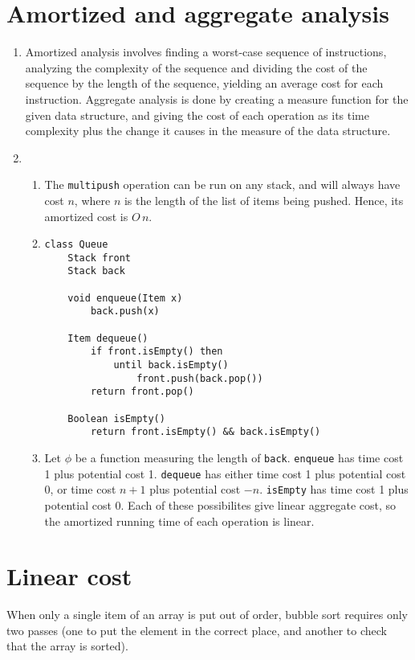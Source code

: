 \documentclass[11pt]{article}
\begin{document}
\section{Amortized and aggregate analysis}
\begin{enumerate}
\item Amortized analysis involves finding a worst-case sequence of instructions, analyzing the complexity of the sequence and dividing the cost of the sequence by the length of the sequence, yielding an average cost for each instruction. Aggregate analysis is done by creating a measure function for the given data structure, and giving the cost of each operation as its time complexity plus the change it causes in the measure of the data structure.
\item
  \begin{enumerate}
  \item The \texttt{multipush} operation can be run on any stack, and will always have cost \(n\), where \(n\) is the length of the list of items being pushed. Hence, its amortized cost is \(O\,n\).
  \item
    \begin{minipage}[t]{\linewidth}
      \begin{lstlisting}
class Queue
    Stack front
    Stack back

    void enqueue(Item x)
        back.push(x)

    Item dequeue()
        if front.isEmpty() then
            until back.isEmpty()
                front.push(back.pop())
        return front.pop()

    Boolean isEmpty()
        return front.isEmpty() && back.isEmpty()
      \end{lstlisting}
    \end{minipage}
  \item Let \(\phi\) be a function measuring the length of \texttt{back}. \texttt{enqueue} has time cost 1 plus potential cost 1. \texttt{dequeue} has either time cost 1 plus potential cost 0, or time cost \(n+1\) plus potential cost \(-n\). \texttt{isEmpty} has time cost 1 plus potential cost 0. Each of these possibilites give linear aggregate cost, so the amortized running time of each operation is linear.
  \end{enumerate}
\end{enumerate}

\section{Linear cost}
When only a single item of an array is put out of order, bubble sort requires only two passes (one to put the element in the correct place, and another to check that the array is sorted).
\end{document}
